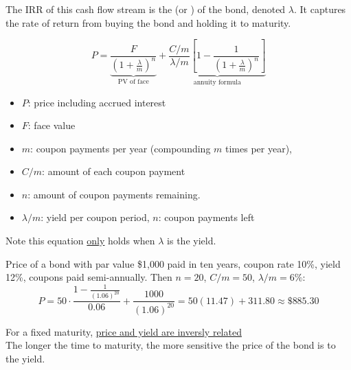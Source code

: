 \begin{center}
\end{center}

The IRR of this cash flow stream is the  (or ) of the bond, denoted $\lambda$. It captures the rate of return from buying the bond and holding it to maturity.

\[\boxed{P = \underbrace{\frac{F}{\left(1+\frac{\lambda}{m}\right)^n}}_{\text{PV of face}} + \underbrace{\frac{C/m}{\lambda/m}\left[1-\frac{1}{\left(1+\frac{\lambda}{m}\right)^n}\right]}_{\text{annuity formula}}}\]
\begin{itemize}
    \item $P$: price including accrued interest
    \item $F$: face value
    \item $m$: coupon payments per year (compounding $m$ times per year), 
    \item $C/m$: amount of each coupon payment
    \item $n$: amount of coupon payments remaining.
    \item $\lambda/m$: yield per coupon period, $n$: coupon payments left
\end{itemize}
Note this equation \underline{only} holds when $\lambda$ is the yield.

\begin{example}
    Price of a bond with par value \$1,000 paid in ten years, coupon rate 10\%, yield 12\%, coupons paid semi-annually. Then $n = 20$, $C/m = 50$, $\lambda/m = 6\%$:
    \[P = 50\cdot\frac{1-\frac{1}{(1.06)^{20}}}{0.06} + \frac{1000}{(1.06)^{20}} = 50(11.47) + 311.80 \approx \$885.30\]
\end{example}

For a fixed maturity, \underline{price and yield are inversly related}
\\The longer the time to maturity, the more sensitive the price of the bond is to the yield.

